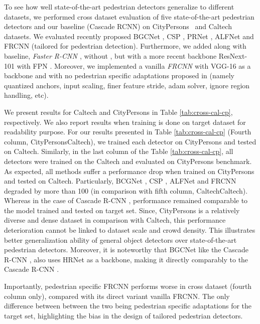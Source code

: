 \documentclass[final]{cvpr}
\newcommand{\caltech}[1]{{Caltech~\cite{dollar2012pedestrian}}}
\newcommand{\cityperson}[1]{{CityPersons~\cite{zhang2017citypersons}}}
\newcommand{\caltecha}[1]{{Caltech}}
\newcommand{\citypersona}[1]{{CityPersons}}
\begin{document}
To see how well state-of-the-art pedestrian detectors generalize to different datasets, we performed cross dataset evaluation of five state-of-the-art pedestrian detectors and our baseline (Cascade RCNN) on \cityperson{} and \caltech{} datasets. 
We evaluated recently proposed BGCNet \cite{li2020box}, CSP \cite{Liu2018DBC}, PRNet \cite{song2020progressive}, ALFNet \cite{liu2018learning} and FRCNN \cite{zhang2017citypersons}(tailored for pedestrian detection). 
Furthermore, we added along with baseline, \emph{Faster R-CNN \cite{ren2015faster}}, without , but with a more recent backbone ResNext-101 \cite{xie2017aggregated} with FPN \cite{lin2017feature}. Moreover, we implemented a vanilla \emph{FRCNN \cite{zhang2017citypersons}}  with VGG-16 \cite{simonyan2014very} as a backbone and with no pedestrian specific adaptations proposed in \cite{zhang2017citypersons} (namely quantized anchors, input scaling, finer feature stride, adam solver, ignore region handling, etc).

We present results for \caltecha{} and \citypersona{} in Table \ref{tab:cross-cal-cp}, respectively. 
We also report results when training is done on target dataset for readability purpose. For our results presented in Table \ref{tab:cross-cal-cp} (Fourth column, CityPersonsCaltech), we trained each detector on \citypersona{} and tested on \caltecha{}. Similarly, in the last column of the Table \ref{tab:cross-cal-cp}, all detectors were trained on the \caltecha{} and evaluated on \citypersona{} benchmark. 
As expected, all methods suffer a performance drop when trained on \citypersona{} and tested on \caltecha{}. Particularly, BCGNet \cite{li2020box}, CSP \cite{Liu2018DBC}, ALFNet \cite{liu2018learning} and FRCNN \cite{zhang2017citypersons} degraded by more than 100  (in comparison with fifth column, CaltechCaltech). 
Whereas in the case of Cascade R-CNN \cite{cai2019cascade}, performance remained comparable to the model trained and tested on target set. 
Since, \citypersona{} is a relatively diverse and dense dataset in comparison with \caltecha{}, this performance deterioration cannot be linked to dataset scale and crowd density. 
This illustrates better generalization ability of general object detectors over state-of-the-art pedestrian detectors. Moreover, it is noteworthy that BGCNet \cite{li2020box} like the Cascade R-CNN \cite{cai2019cascade}, also uses HRNet \cite{wang2019deep} as a backbone, making it directly comparably to the Cascade R-CNN \cite{cai2019cascade}.  

Importantly, pedestrian specific FRCNN \cite{zhang2017citypersons} performs worse in cross dataset (fourth column only), compared with its direct variant vanilla FRCNN. The only difference between between the two being pedestrian specific adaptations for the target set, highlighting the bias in the design of tailored pedestrian detectors. 
\end{document}
